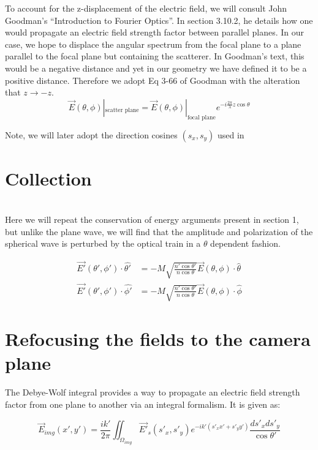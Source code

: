   To account for the z-displacement of the electric field, we will consult 
  John Goodman's ``Introduction to Fourier Optics''. In section 3.10.2, he 
  details
  how one would propagate an electric field strength factor between parallel
  planes. In our case, we hope to displace the 
  angular spectrum from the focal plane to a plane parallel to the focal plane
  but containing the scatterer. In Goodman's text\cite{goodman05}, this would be a negative
  distance and yet in our geometry we have defined it to be a positive distance.
  Therefore we adopt Eq 3-66 of Goodman with the alteration that  $z \rightarrow -z$.
  \begin{equation*}
    \vec{E}(\theta, \phi)|_{\text{scatter plane}} = \vec{E}(\theta, \phi)|_{\text{focal plane}} e^{-i\frac{2\pi}{\lambda}z\cos{\theta} }
  \end{equation*}

  Note, we will later adopt the direction cosines $(s_x, s_y)$ used in
  \section{Collection}\\
  Here we will repeat the conservation of energy arguments present in section
  1, but unlike the plane wave, we will find that the amplitude and 
  polarization of the spherical wave is perturbed by the optical train in a 
  $\theta$ dependent fashion. 

  \begin{equation*}
    \begin{split}
    \vec{E'}(\theta', \phi')\cdot\hat{\theta'} & = - M \sqrt{ \frac{n'\cos{\theta'}}{n\cos{\theta}}}\vec{E}(\theta, \phi)\cdot\hat{\theta}\\
    \vec{E'}(\theta', \phi')\cdot\hat{\phi'} & = - M \sqrt{ \frac{n'\cos{\theta'}}{n\cos{\theta}}}\vec{E}(\theta, \phi)\cdot\hat{\phi}
    \end{split}
  \end{equation*}

\section{Refocusing the fields to the camera plane}
  The Debye-Wolf integral provides a way to propagate an electric field strength
  factor from one plane to another via an integral formalism. It is given 
  as:

  \begin{equation*}
    \vec{E}_{img}(x', y') = \frac{i k'}{2 \pi} \iint_{\Omega_{img}} \vec{E'}_s(s'_x, s'_y) e^{-ik'(s'_xx'+s'_yy')}\frac{ds'_xds'_y}{\cos{\theta'}}
  \end{equation*}

